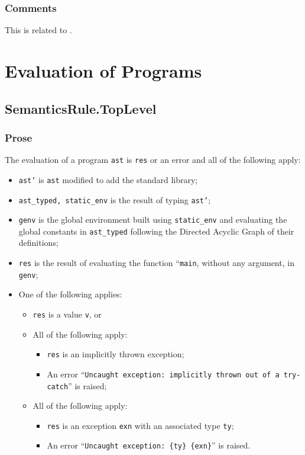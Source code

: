 \documentclass{book}
\begin{document}
  \subsection{Comments}
  This is related to .

\chapter{Evaluation of Programs}

  \section{SemanticsRule.TopLevel \label{sec:SemanticsRule.TopLevel}}

  \subsection{Prose}
  The evaluation of a program \texttt{ast} is \texttt{res} or an error
  and all of the following apply:
  \begin{itemize}
  \item \texttt{ast’} is \texttt{ast} modified to add the standard library;
  \item \texttt{ast\_typed, static\_env} is the result of typing \texttt{ast’};
  \item \texttt{genv} is the global environment built using \texttt{static\_env} and evaluating the global constants in \texttt{ast\_typed} following the Directed Acyclic Graph of their definitions;
  \item \texttt{res} is the result of evaluating the function ``\texttt{main}, without any argument, in \texttt{genv};
  \item One of the following applies:
        \begin{itemize}
	\item \texttt{res} is a value \texttt{v}, or
	\item All of the following apply:
              \begin{itemize}
              \item \texttt{res} is an implicitly thrown exception;
	      \item An error ``\texttt{Uncaught exception: implicitly thrown out of a try-catch}'' is raised;
              \end{itemize}
	\item All of the following apply:
              \begin{itemize}
              \item \texttt{res} is an exception \texttt{exn} with an associated type \texttt{ty};
	      \item An error ``\texttt{Uncaught exception: \{ty\} \{exn\}}'' is raised.
              \end{itemize}
        \end{itemize}
  \end{itemize}
\end{document}
